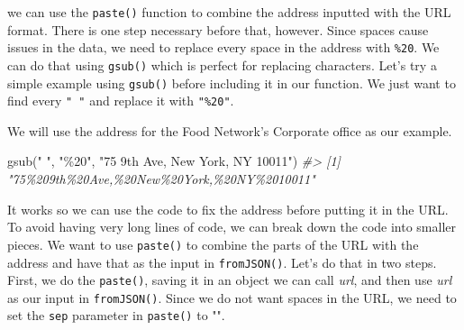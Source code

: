 \documentclass[
  12pt,
]{book}
\newenvironment{Shaded}{\begin{snugshade}}{\end{snugshade}}
\newcommand{\AttributeTok}[1]{\textcolor[rgb]{0.61,0.61,0.61}{#1}}
\newcommand{\CommentTok}[1]{\textcolor[rgb]{0.37,0.37,0.37}{\textit{#1}}}
\newcommand{\ControlFlowTok}[1]{\textcolor[rgb]{0.27,0.27,0.27}{\textbf{#1}}}
\newcommand{\DecValTok}[1]{\textcolor[rgb]{0.06,0.06,0.06}{#1}}
\newcommand{\FunctionTok}[1]{\textcolor[rgb]{0,0,0}{#1}}
\newcommand{\NormalTok}[1]{#1}
\newcommand{\OtherTok}[1]{\textcolor[rgb]{0.37,0.37,0.37}{#1}}
\newcommand{\SpecialCharTok}[1]{\textcolor[rgb]{0,0,0}{#1}}
\newcommand{\StringTok}[1]{\textcolor[rgb]{0.5,0.5,0.5}{#1}}
\begin{document}
we can use the \texttt{paste()} function to combine the address inputted with the URL format. There is one step necessary before that, however. Since spaces cause issues in the data, we need to replace every space in the address with \texttt{\%20}. We can do that using \texttt{gsub()} which is perfect for replacing characters. Let's try a simple example using \texttt{gsub()} before including it in our function. We just want to find every \texttt{"\ "} and replace it with \texttt{"\%20"}.

We will use the address for the Food Network's Corporate office as our example.

\begin{Shaded}
\begin{Highlighting}[]
\FunctionTok{gsub}\NormalTok{(}\StringTok{" "}\NormalTok{, }\StringTok{"\%20"}\NormalTok{, }\StringTok{"75 9th Ave, New York, NY 10011"}\NormalTok{)}
\CommentTok{\#\textgreater{} [1] "75\%209th\%20Ave,\%20New\%20York,\%20NY\%2010011"}
\end{Highlighting}
\end{Shaded}

It works so we can use the code to fix the address before putting it in the URL. To avoid having very long lines of code, we can break down the code into smaller pieces. We want to use \texttt{paste()} to combine the parts of the URL with the address and have that as the input in \texttt{fromJSON()}. Let's do that in two steps. First, we do the \texttt{paste()}, saving it in an object we can call \emph{url}, and then use \emph{url} as our input in \texttt{fromJSON()}. Since we do not want spaces in the URL, we need to set the \texttt{sep} parameter in \texttt{paste()} to "".

\begin{Shaded}
\end{Shaded}
\end{document}
